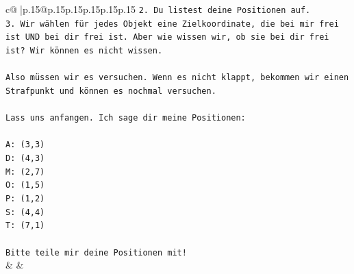 \documentclass{article}
\begin{document}
{\begin{supertabular}{c@{$\;$}|p{.15\linewidth}@{}p{.15\linewidth}p{.15\linewidth}p{.15\linewidth}p{.15\linewidth}p{.15\linewidth}}
{{{\texttt{2. Du listest deine Positionen auf.} \\
\texttt{3. Wir wählen für jedes Objekt eine Zielkoordinate, die bei mir frei ist UND bei dir frei ist. Aber wie wissen wir, ob sie bei dir frei ist? Wir können es nicht wissen.} \\
\\ 
\texttt{Also müssen wir es versuchen. Wenn es nicht klappt, bekommen wir einen Strafpunkt und können es nochmal versuchen.} \\
\\ 
\texttt{Lass uns anfangen. Ich sage dir meine Positionen:} \\
\\ 
\texttt{A: (3,3)} \\
\texttt{D: (4,3)} \\
\texttt{M: (2,7)} \\
\texttt{O: (1,5)} \\
\texttt{P: (1,2)} \\
\texttt{S: (4,4)} \\
\texttt{T: (7,1)} \\
\\ 
\texttt{Bitte teile mir deine Positionen mit!} \\
            }
        }
    }
    & & \\ \\


\end{supertabular}}
\end{document}
